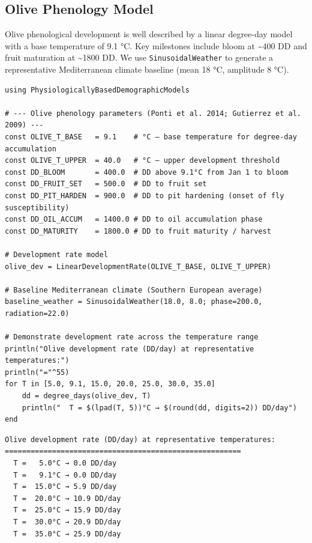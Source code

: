 \subsection{Olive Phenology Model}



\label{18102429766852475428}{}


Olive phenological development is well described by a linear degree-day model with a base temperature of 9.1 °C. Key milestones include bloom at {\textasciitilde}400 DD and fruit maturation at {\textasciitilde}1800 DD. We use \texttt{SinusoidalWeather} to generate a representative Mediterranean climate baseline (mean 18 °C, amplitude 8 °C).




\begin{verbatim}
using PhysiologicallyBasedDemographicModels

# --- Olive phenology parameters (Ponti et al. 2014; Gutierrez et al. 2009) ---
const OLIVE_T_BASE   = 9.1    # °C — base temperature for degree-day accumulation
const OLIVE_T_UPPER  = 40.0   # °C — upper development threshold
const DD_BLOOM       = 400.0  # DD above 9.1°C from Jan 1 to bloom
const DD_FRUIT_SET   = 500.0  # DD to fruit set
const DD_PIT_HARDEN  = 900.0  # DD to pit hardening (onset of fly susceptibility)
const DD_OIL_ACCUM   = 1400.0 # DD to oil accumulation phase
const DD_MATURITY    = 1800.0 # DD to fruit maturity / harvest

# Development rate model
olive_dev = LinearDevelopmentRate(OLIVE_T_BASE, OLIVE_T_UPPER)

# Baseline Mediterranean climate (Southern European average)
baseline_weather = SinusoidalWeather(18.0, 8.0; phase=200.0, radiation=22.0)

# Demonstrate development rate across the temperature range
println("Olive development rate (DD/day) at representative temperatures:")
println("="^55)
for T in [5.0, 9.1, 15.0, 20.0, 25.0, 30.0, 35.0]
    dd = degree_days(olive_dev, T)
    println("  T = $(lpad(T, 5))°C → $(round(dd, digits=2)) DD/day")
end
\end{verbatim}




\begin{verbatim}
Olive development rate (DD/day) at representative temperatures:
=======================================================
  T =   5.0°C → 0.0 DD/day
  T =   9.1°C → 0.0 DD/day
  T =  15.0°C → 5.9 DD/day
  T =  20.0°C → 10.9 DD/day
  T =  25.0°C → 15.9 DD/day
  T =  30.0°C → 20.9 DD/day
  T =  35.0°C → 25.9 DD/day
\end{verbatim}



